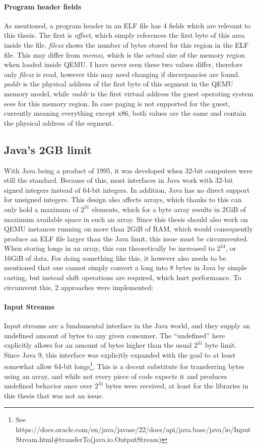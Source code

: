 \paragraph{Program header fields}
As mentioned, a program header in an ELF file has 4 fields which are relevant to this thesis.
The first is \emph{offset}, which simply references the first byte of this area inside the file.
\emph{filesz} shows the number of bytes stored for this region in the ELF file.
This may differ from \emph{memsz}, which is the actual size of the memory region when loaded inside QEMU.
I have never seen these two values differ, therefore only \emph{filesz} is read,
however this may need changing if discrepancies are found.
\emph{paddr} is the physical address of the first byte of this segment in the QEMU memory model,
while \emph{vaddr} is the first virtual address the guest operating system sees for this memory region.
In case paging is not supported for the guest, currently meaning everything except x86,
both values are the same and contain the physical address of the segment.

\subsection{Java's 2GB limit}\label{sec:Java_2GB}
With Java being a product of 1995, it was developed when 32-bit computers were still the standard.
Because of this, most interfaces in Java work with 32-bit signed integers instead of 64-bit integers.
In addition, Java has no direct support for unsigned integers.
This design also affects arrays, which thanks to this can only hold a maximum of $2^{31}$ elements,
which for a byte array results in 2GiB of maximum available space in such an array.
Since this thesis should also work on QEMU instances running on more than 2GiB of RAM,
which would consequently produce an ELF file larger than the Java limit,
this issue must be circumvented.
When storing longs in an array, this can theoretically be increased to $2^{34}$, or 16GiB of data.
For doing something like this, it however also needs to be mentioned that one cannot simply convert a long into 8 bytes in Java by simple casting,
but instead shift operations are required, which hurt performance.
To circumvent this, 2 approaches were implemented:

\paragraph{Input Streams}
Input streams are a fundamental interface in the Java world,
and they supply an undefined amount of bytes to any given consumer.
The \enquote{undefined} here explicitly allows for an amount of bytes higher than the usual $2^{31}$ byte limit.
Since Java 9, this interface was explicitly expanded with the goal to at least somewhat allow 64-bit longs\footnote{See https://docs.oracle.com/en/java/javase/22/docs/api/java.base/java/io/InputStream.html#transferTo(java.io.OutputStream)}.
This is a decent substitute for transferring bytes using an array,
and while not every piece of code expects it and produces undefined behavior
once over $2^{31}$ bytes were received, at least for the libraries in this thesis that was not an issue.

